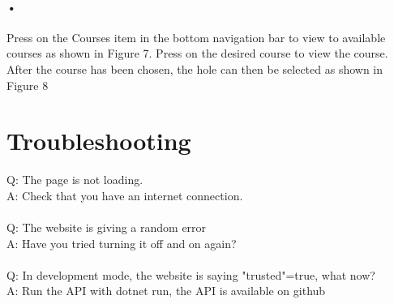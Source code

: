 \documentclass{article}
\begin{document}
	
	\paragraph{•}
	Press on the Courses item in the bottom navigation bar to view to available courses as shown in Figure 7. Press on the desired course to view the course. After the course has been chosen, the hole can then be selected as shown in Figure 8
	
	\section{Troubleshooting}
	
	Q: The page is not loading.
	\\
	A: Check that you have an internet connection.
	\\
	\\
	Q: The website is giving a random error
	\\
	A: Have you tried turning it off and on again?
	\\
	\\
	Q: In development mode, the website is saying "trusted"=true, what now?
	\\
	A: Run the API with dotnet run, the API is available on github
	
	

	
	
\end{document}
